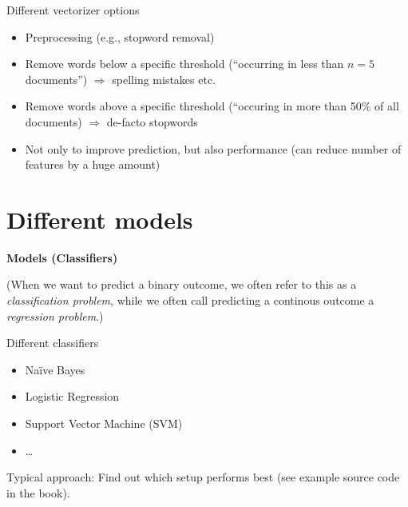 \documentclass{beamer}
\begin{document}
\begin{frame}{Different vectorizer options}
\begin{itemize}
\item Preprocessing (e.g., stopword removal)
\item Remove words below a specific threshold (``occurring in less than $n=5$ documents'') $\Rightarrow$ spelling mistakes etc.
\item Remove words above a specific threshold (``occuring in more than 50\% of all documents) $\Rightarrow$ de-facto stopwords
\item Not only to improve prediction, but also performance (can reduce number of features by a huge amount)
\end{itemize}
\end{frame}








\section{Different models}


\begin{frame}[plain]
\textbf{Models (Classifiers)}

\vspace{1cm}

\footnotesize{(When we want to predict a binary outcome, we often refer to this as a \emph{classification problem}, while we often call predicting a continous outcome a \emph{regression problem}.)}
\end{frame}

\begin{frame}{Different classifiers}
\begin{itemize}
\item Naïve Bayes
\item Logistic Regression
\item Support Vector Machine (SVM)
\item \ldots
\end{itemize}
Typical approach: Find out which setup performs best (see example source code in the book).
\end{frame}
\end{document}

